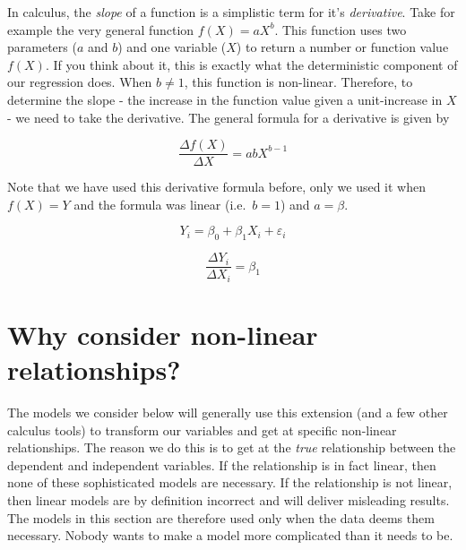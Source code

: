 \documentclass[
]{book}
\begin{document}
In calculus, the \emph{slope} of a function is a simplistic term for it's \emph{derivative}. Take for example the very general function \(f(X) = aX^b\). This function uses two parameters (\(a\) and \(b\)) and one variable (\(X\)) to return a number or function value \(f(X)\). If you think about it, this is exactly what the deterministic component of our regression does. When \(b\neq1\), this function is non-linear. Therefore, to determine the slope - the increase in the function value given a unit-increase in \(X\) - we need to take the derivative. The general formula for a derivative is given by

\[\frac{\Delta f(X)}{\Delta X}=abX^{b-1}\]

Note that we have used this derivative formula before, only we used it when \(f(X)=Y\) and the formula was linear (i.e.~\(b=1\)) and \(a = \beta\).

\[Y_i = \beta_0 + \beta_1 X_i + \varepsilon_i\]

\[\frac{\Delta Y_i}{\Delta X_i}=\beta_1\]

\section{Why consider non-linear relationships?}\label{why-consider-non-linear-relationships}

The models we consider below will generally use this extension (and a few other calculus tools) to transform our variables and get at specific non-linear relationships. The reason we do this is to get at the \emph{true} relationship between the dependent and independent variables. If the relationship is in fact linear, then none of these sophisticated models are necessary. If the relationship is not linear, then linear models are by definition incorrect and will deliver misleading results. The models in this section are therefore used only when the data deems them necessary. Nobody wants to make a model more complicated than it needs to be.
\end{document}
